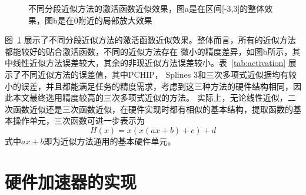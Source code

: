 \begin{figure}[htbp]
	\centering
	\caption{不同分段近似方法的激活函数近似效果，图a是在区间[-3,3]的整体效果，图b是在0附近的局部放大效果}
\label{fig:activationErr}
\end{figure}


图~\ref{fig:activationErr} 展示了不同分段近似方法的激活函数近似效果。整体而言，所有的近似方法都能较好的贴合激活函数，不同的近似方法存在
微小的精度差异，如图b所示，其中线性近似方法误差较大，其余的非现近似方法误差较小。表~\ref{tab:activation} 展示了不同近似方法的误差值，其中PCHIP，
Splines 3和三次多项式近似据均有较小的误差，并且都能满足任务的精度需求，考虑到这三种方法的硬件结构相同，因此本文最终选用精度较高的三次多项式近似的方法。
实际上，无论线性近似，二次函数近似还是三次函数近似，在硬件实现时都有相似的基本结构，提取函数的基本操作单元，三次函数可进一步表示为
\begin{equation}
H(x) = x(x(ax+b)+c) + d
\end{equation}
式中\(ax+b\)即为近似方法通用的基本硬件单元。

\vspace{-4em}
\section{硬件加速器的实现}

